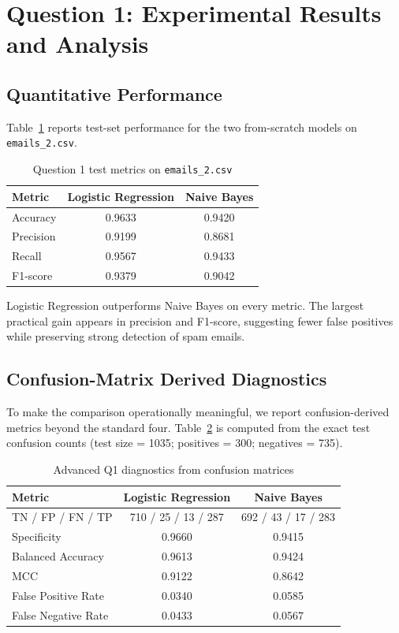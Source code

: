 \section{Question 1: Experimental Results and Analysis}

\subsection{Quantitative Performance}

Table~\ref{tab:q1-main} reports test-set performance for the two from-scratch models on \texttt{emails\_2.csv}.

\begin{table}[H]
\centering
\caption{Question 1 test metrics on \texttt{emails\_2.csv}}
\label{tab:q1-main}
\begin{tabular}{lcc}
\toprule
Metric & Logistic Regression & Naive Bayes \\
\midrule
Accuracy  & 0.9633 & 0.9420 \\
Precision & 0.9199 & 0.8681 \\
Recall    & 0.9567 & 0.9433 \\
F1-score  & 0.9379 & 0.9042 \\
\bottomrule
\end{tabular}
\end{table}

Logistic Regression outperforms Naive Bayes on every metric. The largest practical gain appears in precision and F1-score, suggesting fewer false positives while preserving strong detection of spam emails.

\subsection{Confusion-Matrix Derived Diagnostics}

To make the comparison operationally meaningful, we report confusion-derived metrics beyond the standard four. Table~\ref{tab:q1-advanced} is computed from the exact test confusion counts (test size = 1035; positives = 300; negatives = 735).

\begin{table}[H]
\centering
\caption{Advanced Q1 diagnostics from confusion matrices}
\label{tab:q1-advanced}
\begin{tabular}{lcc}
\toprule
Metric & Logistic Regression & Naive Bayes \\
\midrule
TN / FP / FN / TP & 710 / 25 / 13 / 287 & 692 / 43 / 17 / 283 \\
Specificity & 0.9660 & 0.9415 \\
Balanced Accuracy & 0.9613 & 0.9424 \\
MCC & 0.9122 & 0.8642 \\
False Positive Rate & 0.0340 & 0.0585 \\
False Negative Rate & 0.0433 & 0.0567 \\
\bottomrule
\end{tabular}
\end{table}

